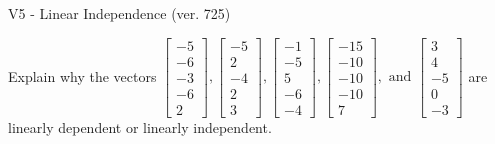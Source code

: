\begin{exercise}
  \begin{exerciseTitle}V5 - Linear Independence (ver. 725)\end{exerciseTitle}
  \begin{exerciseStatement}
    Explain why the vectors \(\left[\begin{array}{r}
-5 \\
-6 \\
-3 \\
-6 \\
2
\end{array}\right] , \left[\begin{array}{r}
-5 \\
2 \\
-4 \\
2 \\
3
\end{array}\right] , \left[\begin{array}{r}
-1 \\
-5 \\
5 \\
-6 \\
-4
\end{array}\right] , \left[\begin{array}{r}
-15 \\
-10 \\
-10 \\
-10 \\
7
\end{array}\right] , \text{ and } \left[\begin{array}{r}
3 \\
4 \\
-5 \\
0 \\
-3
\end{array}\right]\) are linearly dependent or linearly independent.	



\end{exerciseStatement}
\end{exercise}
